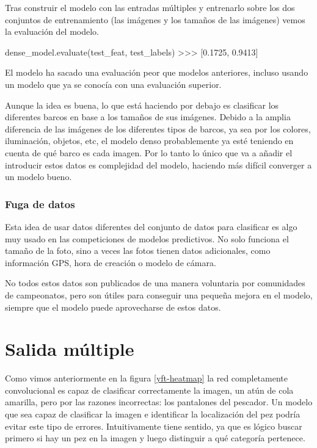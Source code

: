 Tras construir el modelo con las entradas múltiples y entrenarlo sobre los dos conjuntos de entrenamiento (las imágenes y los tamaños de las imágenes) vemos la evaluación del modelo.

\begin{python}
dense_model.evaluate(test_feat, test_labels)
>>> [0.1725, 0.9413]
\end{python}

El modelo ha sacado una evaluación peor que modelos anteriores, incluso usando un modelo que ya se conocía con una evaluación superior.

Aunque la idea es buena, lo que está haciendo por debajo es clasificar los diferentes barcos en base a los tamaños de sus imágenes. Debido a la amplia diferencia de las imágenes de los diferentes tipos de barcos, ya sea por los colores, iluminación, objetos, etc, el modelo denso probablemente ya esté teniendo en cuenta de qué barco es cada imagen. Por lo tanto lo único que va a añadir el introducir estos datos es complejidad del modelo, haciendo más difícil converger a un modelo bueno.

\subsubsection{Fuga de datos}

Esta idea de usar datos diferentes del conjunto de datos para clasificar es algo muy usado en las competiciones de modelos predictivos. No solo funciona el tamaño de la foto, sino a veces las fotos tienen datos adicionales, como información GPS, hora de creación o modelo de cámara.

No todos estos datos son publicados de una manera voluntaria por comunidades de campeonatos, pero son útiles para conseguir una pequeña mejora en el modelo, siempre que el modelo puede aprovecharse de estos datos.

\section{Salida múltiple}

Como vimos anteriormente en la figura \ref{yft-heatmap} la red completamente convolucional es capaz de clasificar correctamente la imagen, un atún de cola amarilla, pero por las razones incorrectas: los pantalones del pescador. Un modelo que sea capaz de clasificar la imagen e identificar la localización del pez podría evitar este tipo de errores. Intuitivamente tiene sentido, ya que es lógico buscar primero si hay un pez en la imagen y luego distinguir a qué categoría pertenece.

